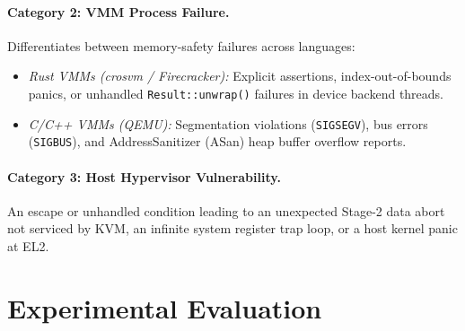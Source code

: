 \documentclass{article}
\begin{document}
\paragraph{Category 2: VMM Process Failure.}
Differentiates between memory-safety failures across languages:
\begin{itemize}[leftmargin=*]
    \item \emph{Rust VMMs (crosvm / Firecracker):} Explicit assertions, index-out-of-bounds panics, or unhandled \texttt{Result::unwrap()} failures in device backend threads.
    \item \emph{C/C++ VMMs (QEMU):} Segmentation violations (\texttt{SIGSEGV}), bus errors (\texttt{SIGBUS}), and AddressSanitizer (ASan) heap buffer overflow reports.
\end{itemize}

\paragraph{Category 3: Host Hypervisor Vulnerability.}
An escape or unhandled condition leading to an unexpected Stage-2 data abort not serviced by KVM, an infinite system register trap loop, or a host kernel panic at EL2.


\section{Experimental Evaluation}\label{sec:eval}
\end{document}
